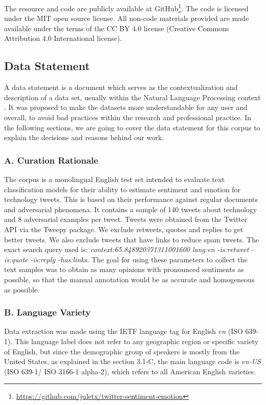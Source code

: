 \documentclass[11pt,a4paper]{article}
\begin{document}
The resource and code are publicly available at GitHub\footnote{\url{https://github.com/juletx/twitter-sentiment-emotion}}. The code is licensed under the MIT open source license. All non-code materials provided are made available under the terms of the CC BY 4.0 license (Creative Commons Attribution 4.0 International license).

\subsection{Data Statement}

A data statement is a document which serves as the contextualization and description of a data set, usually within the Natural Language Processing context \cite{bender-friedman-2018-data}. It was proposed to make the datasets more understandable for any user and overall, to avoid bad practices within the research and professional practice. In the following sections, we are going to cover the data statement for this corpus to explain the decisions and reasons behind our work.

\subsubsection*{A. Curation Rationale}
The corpus is a monolingual English test set intended to evaluate text classification models for their ability to estimate sentiment and emotion for technology tweets. This is based on their performance against regular documents and adversarial phenomena. It contains a sample of 140 tweets about technology and 8 adversarial examples per tweet. Tweets were obtained from the Twitter API via the Tweepy package. We exclude retweets, quotes and replies to get better tweets. We also exclude tweets that have links to reduce spam tweets. The exact search query used is: \textit{context:65.848920371311001600 lang:en -is:retweet -is:quote -is:reply -has:links}. The goal for using these parameters to collect the text samples was to obtain as many opinions with pronounced sentiments as possible, so that the manual annotation would be as accurate and homogeneous as possible.

\subsubsection*{B. Language Variety}
Data extraction was made using the IETF language tag for English \textit{en} (ISO 639-1). This language label does not refer to any geographic region or specific variety of English, but since the demographic group of speakers is mostly from the United States, as explained in the section 3.1-C, the main language code is \textit{en-US} (ISO 639-1/ ISO 3166-1 alpha-2), which refers to all American English varieties.
\end{document}
